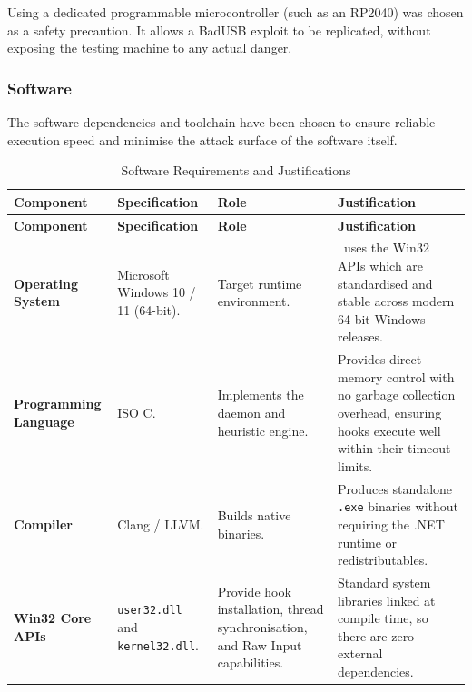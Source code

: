 \begin{note}
	Using a dedicated programmable microcontroller (such as an RP2040) was chosen as a safety precaution. It allows a BadUSB exploit to be replicated, without exposing the testing machine to any actual danger.
\end{note}

\subsubsection{Software}

The software dependencies and toolchain have been chosen to ensure reliable execution speed and minimise the attack surface of the software itself.

	{\small
		\renewcommand{\arraystretch}{1.2}
		\begin{xltabular}{\textwidth}{@{} P{2.5cm} P{2.5cm} L L @{}}
			\caption{Software Requirements and Justifications} \label{tab:software_requirements} \\
			\toprule
			\textbf{Component} & \textbf{Specification} & \textbf{Role} & \textbf{Justification} \\
			\midrule
			\endfirsthead

			\toprule
			\textbf{Component} & \textbf{Specification} & \textbf{Role} & \textbf{Justification} \\
			\midrule
			\endhead


			\textbf{Operating System} & Microsoft Windows 10 / 11 (64-bit). & Target runtime environment. & \projectNameFormatted\ uses the Win32 APIs which are standardised and stable across modern 64-bit Windows releases. \\

			\textbf{Programming Language} & ISO C. & Implements the daemon and heuristic engine. & Provides direct memory control with no garbage collection overhead, ensuring hooks execute well within their timeout limits. \\

			\textbf{Compiler} & Clang / LLVM. & Builds native binaries. & Produces standalone \texttt{.exe} binaries without requiring the .NET runtime or redistributables. \\

			\textbf{Win32 Core APIs} & \texttt{user32.dll} and \texttt{kernel32.dll}. & Provide hook installation, thread synchronisation, and Raw Input capabilities. & Standard system libraries linked at compile time, so there are zero external dependencies. \\


\end{xltabular}}
